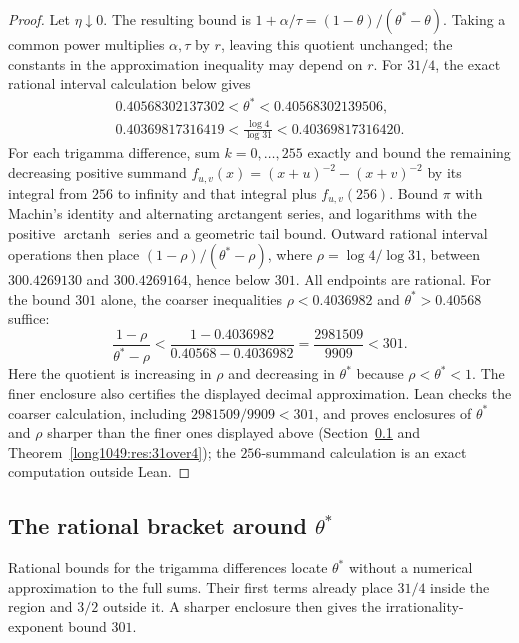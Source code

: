 \begin{proof}
Let $\eta\downarrow0$.  The resulting bound is
$1+\alpha/\tau=(1-\theta)/(\theta^*-\theta)$.
Taking a common power multiplies $\alpha,\tau$ by $r$, leaving this quotient
unchanged; the constants in the approximation inequality may depend on $r$.
For $31/4$, the exact rational interval calculation below gives
\[
\begin{gathered}
 0.40568302137302<\theta^*<0.40568302139506,\\
 0.40369817316419<\frac{\log4}{\log31}<0.40369817316420.
\end{gathered}
\]
For each trigamma difference, sum $k=0,\ldots,255$ exactly and bound the
remaining decreasing positive summand $f_{u,v}(x)=(x+u)^{-2}-(x+v)^{-2}$
by its integral from $256$ to infinity and that integral plus $f_{u,v}(256)$.
Bound $\pi$ with Machin's identity and alternating arctangent series,
and logarithms with the positive $\operatorname{arctanh}$ series and a
geometric tail bound. Outward rational interval operations then place
$(1-\rho)/(\theta^*-\rho)$, where $\rho=\log4/\log31$,
between $300.4269130$ and $300.4269164$, hence below $301$.
All endpoints are rational. For the bound $301$ alone, the coarser
inequalities $\rho<0.4036982$ and $\theta^*>0.40568$ suffice:
\[
 \frac{1-\rho}{\theta^*-\rho}
 <\frac{1-0.4036982}{0.40568-0.4036982}
 =\frac{2981509}{9909}<301.
\]
Here the quotient is increasing in $\rho$ and decreasing in $\theta^*$
because $\rho<\theta^*<1$. The finer enclosure also certifies the
displayed decimal approximation. Lean checks the coarser calculation,
including $2981509/9909<301$, and proves enclosures of $\theta^*$ and
$\rho$ sharper than the finer ones displayed above
(Section~\ref{long1049:sec:regionbracket} and
Theorem~\ref{long1049:res:31over4}); the $256$-summand calculation is an
exact computation outside Lean.
\end{proof}

\subsection{The rational bracket around \texorpdfstring{$\theta^{*}$}{theta*}}\label{long1049:sec:regionbracket}

Rational bounds for the trigamma differences locate $\theta^*$
without a numerical approximation to the full sums. Their first
terms already place $31/4$ inside the region and $3/2$ outside it.
A sharper enclosure then gives the irrationality-exponent bound
$301$.

